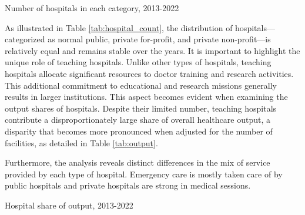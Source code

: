 \documentclass[12pt]{article}
\begin{document}
\begin{table}[h!]\fontsize{10pt}{12pt}\selectfont
    \begin{adjustbox}{width=\textwidth,center}
        \centering
        
    \end{adjustbox}
    \caption{Number of hospitals in each category, 2013-2022}
    \label{tab:hospital_count}
\end{table}

As illustrated in Table \ref{tab:hospital_count}, the distribution of
hospitals—categorized as normal public, private for-profit, and private
non-profit—is relatively equal and remains stable over the years. It is
important to highlight the unique role of teaching hospitals. Unlike other
types of hospitals, teaching hospitals allocate significant resources to doctor
training and research activities. This additional commitment to educational and
research missions generally results in larger institutions. This aspect becomes
evident when examining the output shares of hospitals. Despite their limited
number, teaching hospitals contribute a disproportionately large share of
overall healthcare output, a disparity that becomes more pronounced when
adjusted for the number of facilities, as detailed in Table \ref{tab:output}.

Furthermore, the analysis reveals distinct differences in the mix of service
provided by each type of hospital. Emergency care is mostly taken care of by
public hospitals and private hospitals are strong in medical sessions.

\begin{table}\fontsize{10pt}{12pt}\selectfont
    \begin{adjustbox}{width=\textwidth,center}
        \centering
        \begin{threeparttable}[b]

            
            \caption{Hospital share of output, 2013-2022}
            \label{tab:nonadjusted}
        \end{threeparttable}
    \end{adjustbox}
\end{table}
\end{document}
